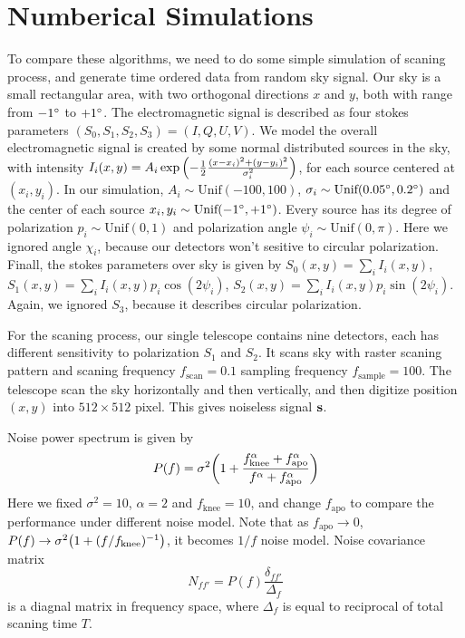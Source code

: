 \documentclass[11pt, letterpaper]{article}
\begin{document}
\section{Numberical Simulations}
To compare these algorithms, we need to do some simple simulation of scaning
process, and generate time ordered data from random sky signal.
Our sky is a small rectangular area, with two orthogonal directions $x$ and
$y$, both with range from $-1\degree$ to $+1\degree$.
The electromagnetic signal is described as four stokes parameters
$(S_0, S_1, S_2, S_3) = (I,Q,U,V)$.
We model the overall electromagnetic signal is created by some normal
distributed sources in the sky, with intensity $I_i (x,y)
= A_i \exp\qty(-\frac{1}{2} \frac{(x-x_{i})^2 + (y-y_{i})^2}{\sigma_i^2})$,
for each source centered at $(x_i,y_i)$.
In our simulation, $A_i \sim \text{Unif} (-100, 100)$,
$\sigma_i \sim \text{Unif}(0.05\degree, 0.2\degree)$ 
and the center of each source
$x_i, y_i \sim \text{Unif}(-1\degree, +1\degree)$.
Every source has its degree of polarization $p_i \sim \text{Unif}(0,1)$ and 
polarization angle $\psi_i \sim \text{Unif}(0,\pi)$.
Here we ignored angle $\chi_i$, because our detectors won't sesitive to
circular polarization.
Finall, the stokes parameters over sky is given by
$S_0(x,y) = \sum_i I_i(x,y)$, $S_1(x,y) = \sum_i I_i(x,y) p_i \cos(2\psi_i)$,
$S_2(x,y) = \sum_i I_i(x,y) p_i \sin(2\psi_i)$.
Again, we ignored $S_3$, because it describes circular polarization.

For the scaning process, our single telescope contains nine detectors,
each has different sensitivity to polarization $S_1$ and $S_2$.
It scans sky with raster scaning pattern and scaning frequency
$f_{\text{scan}} = 0.1$ sampling frequency $f_{\text{sample}} = 100$.
The telescope scan the sky horizontally and then vertically,
and then digitize position $(x, y)$ into $512\times 512$ pixel.
This gives noiseless signal $\vb{s}$.

Noise power spectrum is given by
\begin{align}
P(f) = \sigma^2 \qty(1+ \frac{f_{\text{knee}}^{\alpha}+f_{\text{apo}}^{\alpha}}
    {f^{\alpha}+f_{\text{apo}}^{\alpha}}) \label{noise power spectrum}
\end{align}
Here we fixed $\sigma^2 = 10$, $\alpha = 2$ and $f_{\text{knee}} = 10$,
and change $f_{\text{apo}}$ to compare the performance under different noise
model.
Note that as $f_{\text{apo}} \rightarrow 0 $,
$P(f) \rightarrow \sigma^2\qty(1 + (f/f_{\text{knee}})^{-1} )$, 
it becomes $1/f$ noise model.
Noise covariance matrix 
\begin{equation}
N_{ff'} = P(f) \frac{\delta_{ff'}}{\Delta_f}
\end{equation}
is a diagnal matrix in frequency space, where $\Delta_f$ is equal to reciprocal
of total scaning time $T$.
\end{document}
